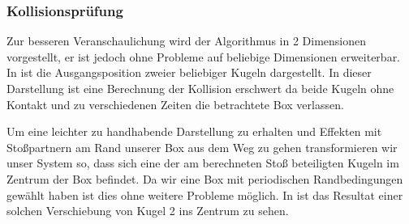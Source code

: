 \subsubsection{Kollisionsprüfung} %

\newcommand{\BoxW}{10}
\newcommand{\BoxH}{7}
\newcommand{\Kradius}{.7}

\newcommand{\Kx}{7}
\newcommand{\Ky}{6}

\newcommand{\vxa}{6/3}
\newcommand{\vya}{2/3}
\newcommand{\vxb}{-5/3}
\newcommand{\vyb}{3/3}

\newcommand{\Dx}{-2.5}
\newcommand{\Dy}{-5}

\newcommand{\BoxC}{\BoxW / 2 , \BoxH / 2}
\newcommand{\BoxWh}{\BoxW / 2}
\newcommand{\BoxHh}{\BoxH / 2}

\newcommand{\drawKugel}[1]{
    \draw[fill=black] 	(#1) circle (0.15em);
    \draw		(#1) circle (\Kradius);
}

\newcommand{\dis}{r_{21}}
\newcommand{\vdis}{\vec{r}_{21}}
\newcommand{\vdissq}{\left|\vdis\right|^2}

\newcommand{\vel}{v_{21}}
\newcommand{\vvel}{\vec{v}_{21}}
\newcommand{\vvelsq}{\left|\vvel\right|^2}
\newcommand{\dia}{d}

Zur besseren Veranschaulichung wird der Algorithmus in 2 Dimensionen vorgestellt, er ist jedoch ohne Probleme auf beliebige Dimensionen erweiterbar.\\
In  ist die Ausgangsposition zweier beliebiger Kugeln dargestellt. In dieser Darstellung ist eine Berechnung der Kollision erschwert da beide Kugeln ohne Kontakt und zu verschiedenen Zeiten die betrachtete Box verlassen.



Um eine leichter zu handhabende Darstellung zu erhalten und Effekten mit Stoßpartnern am Rand unserer Box aus dem Weg zu gehen transformieren wir unser System so, dass sich eine der am berechneten Stoß beteiligten Kugeln im Zentrum der Box befindet. Da wir eine Box mit periodischen Randbedingungen gewählt haben ist dies ohne weitere Probleme möglich. In  ist das Resultat einer solchen Verschiebung von Kugel 2 ins Zentrum zu sehen.

